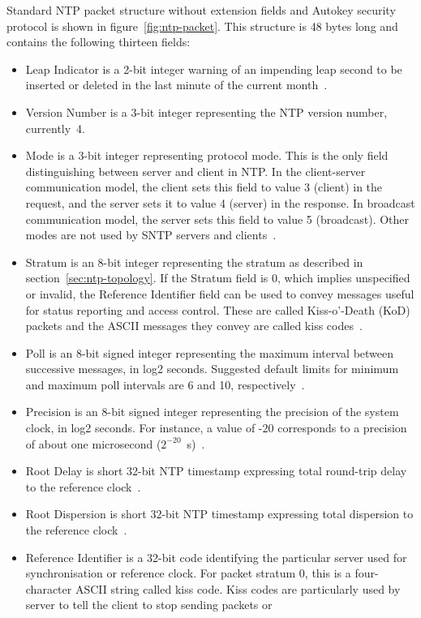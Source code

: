 Standard NTP packet structure without extension fields and
Autokey security protocol is shown in figure~\ref{fig:ntp-packet}.
This structure is 48 bytes long and contains the following thirteen fields:
\begin{itemize}
\item
Leap Indicator is a 2-bit integer warning of an impending leap
second to be inserted or deleted in the last minute of the current month~\cite{rfc5905}.
\item
Version Number is a 3-bit integer representing the NTP
version number, currently~4.
\item
Mode is a 3-bit integer representing protocol mode.
This is the only field distinguishing between server and client in NTP.
In the client-server communication model, the client sets this field to value 3 (client) in the request,
and the server sets it to value 4 (server) in the response.
In broadcast communication model, the server sets this field to value 5 (broadcast).
Other modes are not used by SNTP servers and clients~\cite{rfc4330}.
\item
Stratum is an 8-bit integer representing the stratum as described in section~\ref{sec:ntp-topology}.
If the Stratum field is 0, which implies unspecified or invalid, the
Reference Identifier field can be used to convey messages useful for
status reporting and access control.
These are called Kiss-o'-Death (KoD)
packets and the ASCII messages they convey are called kiss codes~\cite{rfc5905}.
\item
Poll is an 8-bit signed integer representing the maximum interval between
successive messages, in log2 seconds.
Suggested default limits for minimum and maximum poll intervals are 6 and 10, respectively~\cite{rfc5905}.
\item
Precision is an 8-bit signed integer representing the precision of the
system clock, in log2 seconds.
For instance, a value of -20
corresponds to a precision of about one microsecond ($2^{-20}$~s)~\cite{rfc5905}.
\item
Root Delay is short 32-bit NTP timestamp expressing
total round-trip delay to the reference clock~\cite{rfc5905}.
\item
Root Dispersion is short 32-bit NTP timestamp expressing
total dispersion to the reference clock~\cite{rfc5905}.
\item
Reference Identifier is a 32-bit code identifying the particular server used for synchronisation
or reference clock.
For packet stratum 0, this is a four-character ASCII string called kiss code.
Kiss codes are particularly used by server to tell the client to stop sending packets or

\end{itemize}
